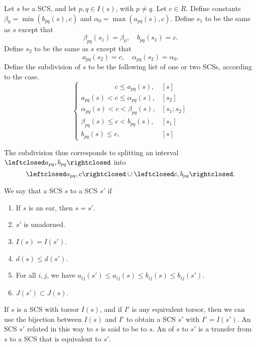 \begin{definition}[subdivision] 
Let $s$ be a SCS,
and let $p,q\in  I(s)$, with $p\ne q$.  Let $c\in\ring{R}$.
Define constants $\beta_0 = \min(b_{pq}(s),c)$ and $\alpha_0=\max(a_{pq}(s),c)$.
Define $s_1$ to be the same as $s$ except that
\[
\beta_{pq}(s_1)= \beta_0,\quad b_{pq}(s_1) = c.
\]
Define $s_2$ to be the same as $s$ except that
\[
a_{pq}(s_2) = c,\quad \alpha_{pq}(s_2) = \alpha_0.
\]
Define the subdivision of $s$ to be the following list of one or two SCSs, according to the case.
\[
\begin{cases}
\phantom{a_{pq}(s) \le } c \le a_{pq}(s), & [s] \\
a_{pq}(s) < c \le \alpha_{pq}(s), & [s_2] \\
\alpha_{pq}(s) < c < \beta_{pq}(s), & [s_1;s_2] \\
\beta_{pq}(s) \le c < b_{pq}(s), & [s_1]\\
b_{pq}(s) \le c, & [s]
\end{cases}
\]
\end{definition}
The subdivision thus corresponds to splitting an interval 
$\leftclosed a_{pq},b_{pq}\rightclosed$ into
\[
\leftclosed a_{pq},c\rightclosed \cup \leftclosed c,b_{pq}\rightclosed.
\]

\begin{definition}  
We say that a SCS $s$
 to a SCS $s'$ if
\begin{enumerate}
\item If $s$ is an ear, then $s=s'$.
\item $s'$ is unadorned.
\item $I(s) = I(s')$.
\item $d(s)\le d(s')$.
\item For all $i,j$, we have $a_{ij}(s')\le a_{ij}(s)\le b_{ij}(s)\le b_{ij}(s')$.
\item $J(s')\subset J(s)$.
\end{enumerate}
\end{definition}

\begin{definition}
If $s$ is a SCS with torsor $I(s)$, and if
$I'$ is any equivalent torsor, then we can use the bijection between $I(s)$ and $I'$
to obtain a SCS $s'$ with $I' = I(s')$.  An
SCS $s'$ related in this way to $s$ is said
to be  to $s$.  An  of $s$
to $s'$ is a transfer from $s$ to a SCS that
is equivalent to $s'$.
\end{definition}

